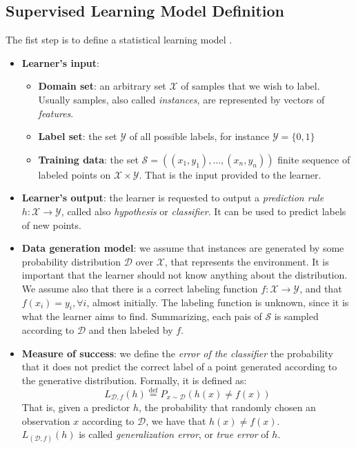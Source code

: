 \subsection{Supervised Learning Model Definition}
The fist step is to define a statistical learning model \cite{Shalev-Shwartz:2014:UML:2621980}.
\begin{itemize}
	\item \textbf{Learner's input}: 
	\begin{itemize}
		\item \textbf{Domain set}: an arbitrary set $\mathcal{X}$ of samples that we wish to label. Usually samples, also called \textit{instances}, are represented by vectors of \textit{features}.
		\item \textbf{Label set}: the set $\mathcal{Y}$ of all possible labels, for instance $\mathcal{Y}=\{0,1\}$
		\item \textbf{Training data}: the set $\mathcal{S}=((x_1,y_1), \dots, (x_n,y_n))$ finite sequence of labeled points on $\mathcal{X} \times \mathcal{Y}$. That is the input provided to the learner.
	\end{itemize}

	\item \textbf{Learner's output}: the learner is requested to output a \textit{prediction rule} $h: \mathcal{X} \rightarrow \mathcal{Y}$, called also \textit{hypothesis} or \textit{classifier}. It can be used to predict labels of new points.
	
	\item \textbf{Data generation model}: we assume that instances are generated by some probability distribution $\mathcal{D}$ over $\mathcal{X}$, that represents the environment. It is important that the learner should not know anything about the distribution. We assume also that there is a correct labeling function $f: \mathcal{X} \rightarrow \mathcal{Y}$, and that $f(x_i) = y_i, \forall i$, almost initially. The labeling function is unknown, since it is what the learner aims to find. Summarizing, each pais of $\mathcal{S}$ is sampled according to $\mathcal{D}$ and then labeled by $f$.
	
	\item  \textbf{Measure of success}: we define the \textit{error of the classifier} the probability that it does not predict the correct label of a point generated according to the generative distribution. Formally, it is defined as:
	\[L_{\mathcal{D},f}(h) \stackrel{\text{def}}{=} P_{x \sim \mathcal{D}}(h(x) \neq f(x)) \]
	That is, given a predictor $h$, the probability that randomly chosen an observation $x$ according to $\mathcal{D}$, we have that $h(x) \neq f(x)$.\\
	$L_{(\mathcal{D},f)}(h)$ is called \textit{generalization error}, or \textit{true error} of $h$.
	
\end{itemize}


